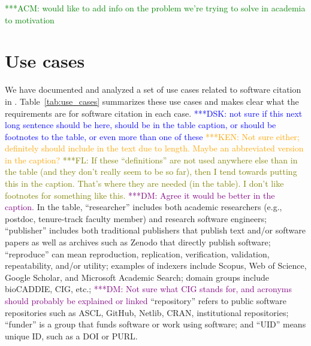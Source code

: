 \documentclass[11pt, oneside]{amsart}
\newcommand{\katznote}[1]{ {\textcolor{blue} { ***DSK: #1 }}}
\newcommand{\niemnote}[1]{ {\textcolor{orange} { ***KEN: #1 }}}
\newcommand{\flnote}[1]{ {\textcolor{olive} { ***FL: #1 }}}
\newcommand{\dmnote}[1]{ {\textcolor{purple} { ***DM: #1 }}} %
\newcommand{\acmnote}[1]{ {\textcolor{green} { ***ACM: #1 }}} %
\begin{document}
 \acmnote{would like to add info on the problem we're trying to solve in academia to motivation} 
 
\section{Use cases}
\label{sec:use_cases}

We have documented and analyzed a set of use cases related to software citation in \cite{SC-Use-Cases}.
Table~\ref{tab:use_cases} summarizes these use cases and makes clear what the requirements are for software citation in each case.
\katznote{not sure if this next long sentence should be here, should be in the table caption, or should be footnotes to the table, or even more than one of these}
\niemnote{Not sure either; definitely should include in the text due to length. Maybe an abbreviated version in the caption?}\flnote{If these ``definitions'' are not used anywhere else than in the table (and they don't really seem to be so far), then I tend towards putting this in the caption. That's where they are needed (in the table). I don't like footnotes for something like this.}\dmnote{Agree it would be better in the caption.}
In the table,
``researcher'' includes both academic researchers (e.g., postdoc, tenure-track faculty member) and research software engineers;
``publisher'' includes both traditional publishers that publish text and\slash or software papers as well as archives such as Zenodo that directly publish software;
``reproduce'' can mean reproduction, replication, verification, validation, repeatability, and\slash or utility;
examples of indexers include Scopus, Web of Science, Google Scholar, and Microsoft Academic Search;
domain groups include bioCADDIE, CIG, etc.;\dmnote{Not sure what CIG stands for, and acronyms should probably be explained or linked}
``repository'' refers to public software repositories such as ASCL,
GitHub, Netlib, CRAN, institutional repositories;
``funder'' is a group that funds software or work using software; and
``UID'' means unique ID, such as a DOI or PURL.
\end{document}
